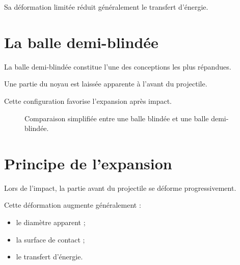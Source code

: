 Sa déformation limitée réduit généralement le transfert d'énergie.

\section{La balle demi-blindée}

La balle demi-blindée constitue l'une des conceptions les plus répandues.

Une partie du noyau est laissée apparente à l'avant du projectile.

Cette configuration favorise l'expansion après impact.

\begin{figure}[htbp]
\centering


\caption{Comparaison simplifiée entre une balle blindée et une balle demi-blindée.}
\label{fig:fmj_demi_blindee}

\end{figure}

\section{Principe de l'expansion}

Lors de l'impact, la partie avant du projectile se déforme progressivement.

Cette déformation augmente généralement :

\begin{itemize}
    \item le diamètre apparent ;
    \item la surface de contact ;
    \item le transfert d'énergie.
\end{itemize}

